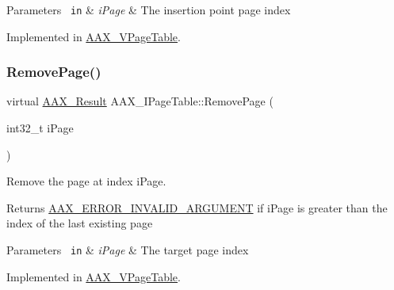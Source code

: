 \begin{DoxyParams}[1]{Parameters}
\mbox{\texttt{ in}}  & {\em i\+Page} & The insertion point page index \\
\hline
\end{DoxyParams}


Implemented in \mbox{\hyperlink{a01929_a65d873c58f26c3e01db0d585e15eac36}{A\+A\+X\+\_\+\+V\+Page\+Table}}.

\mbox{\label{a01849_a2e5def73da595907d6486ff199168dd3}} 
\subsubsection{\texorpdfstring{RemovePage()}{RemovePage()}}
{\footnotesize\ttfamily virtual \mbox{\hyperlink{a00392_a4d8f69a697df7f70c3a8e9b8ee130d2f}{A\+A\+X\+\_\+\+Result}} A\+A\+X\+\_\+\+I\+Page\+Table\+::\+Remove\+Page (\begin{DoxyParamCaption}\item[{int32\+\_\+t}]{i\+Page }\end{DoxyParamCaption})\hspace{0.3cm}{\ttfamily [pure virtual]}}



Remove the page at index {\ttfamily i\+Page}. 

\begin{DoxyReturn}{Returns}
\mbox{\hyperlink{a00494_a5f8c7439f3a706c4f8315a9609811937a7d27a3bd88231e331c98d85f5b10e2eb}{A\+A\+X\+\_\+\+E\+R\+R\+O\+R\+\_\+\+I\+N\+V\+A\+L\+I\+D\+\_\+\+A\+R\+G\+U\+M\+E\+NT}} if {\ttfamily i\+Page} is greater than the index of the last existing page
\end{DoxyReturn}

\begin{DoxyParams}[1]{Parameters}
\mbox{\texttt{ in}}  & {\em i\+Page} & The target page index \\
\hline
\end{DoxyParams}


Implemented in \mbox{\hyperlink{a01929_a15c5b3080afec26837256639525b435b}{A\+A\+X\+\_\+\+V\+Page\+Table}}.

\mbox{\label{a01849_a010687dbfe12a232c393e3af03ea1ef0}} 
